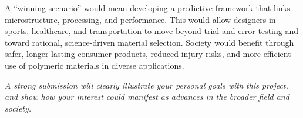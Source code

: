 \begin{enumerate}
\begin{itemize}
A “winning scenario” would mean developing a predictive framework that links microstructure, processing, and performance. This would allow designers in sports, healthcare, and transportation to move beyond trial-and-error testing and toward rational, science-driven material selection. Society would benefit through safer, longer-lasting consumer products, reduced injury risks, and more efficient use of polymeric materials in diverse applications.
\end{itemize}
\end{enumerate}

\emph{A strong submission will clearly illustrate your personal goals with this project, and show how your interest could manifest as advances in the broader field and society.}





